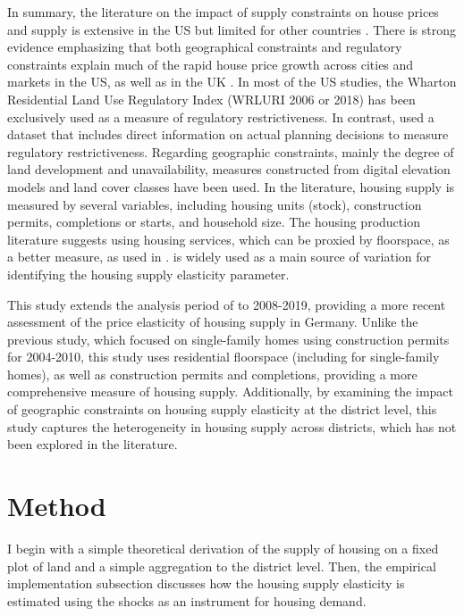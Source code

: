 \documentclass[
  12pt,
]{article}
\begin{document}
In summary, the literature on the impact of supply constraints on house
prices and supply is extensive in the US but limited for other countries
\citep{hilber_vermeulen_2016}. There is strong evidence emphasizing that
both geographical constraints \citep[see][]{saiz_2010, paciorek_2013}
and regulatory constraints
\citep[see][]{glaeser_gyourko_2005, paciorek_2013, gyourko_etal_2021, glaeser_2020}
explain much of the rapid house price growth across cities and markets
in the US, as well as in the UK \citep{hilber_vermeulen_2016}. In most
of the US studies, the Wharton Residential Land Use Regulatory Index
(WRLURI 2006 or 2018) has been exclusively used as a measure of
regulatory restrictiveness. In contrast, \citet{hilber_vermeulen_2016}
used a dataset that includes direct information on actual planning
decisions to measure regulatory restrictiveness. Regarding geographic
constraints, mainly the degree of land development and unavailability,
measures constructed from digital elevation models and land cover
classes have been used. In the literature, housing supply is measured by
several variables, including housing units (stock), construction
permits, completions or starts, and household size. The housing
production literature \citep[see][]{epple_etal_2010, combes_etal_2021}
suggests using housing services, which can be proxied by floorspace, as
a better measure, as used in \citet{baum-snow_han_2019}.
\citet{bartik_1991} is widely used as a main source of variation for
identifying the housing supply elasticity parameter.

This study extends the analysis period of \citet{lerbs_2014} to
2008-2019, providing a more recent assessment of the price elasticity of
housing supply in Germany. Unlike the previous study, which focused on
single-family homes using construction permits for 2004-2010, this study
uses residential floorspace (including for single-family homes), as well
as construction permits and completions, providing a more comprehensive
measure of housing supply. Additionally, by examining the impact of
geographic constraints on housing supply elasticity at the district
level, this study captures the heterogeneity in housing supply across
districts, which has not been explored in the literature.

\section{Method}\label{method}

I begin with a simple theoretical derivation of the supply of housing on
a fixed plot of land and a simple aggregation to the district level.
Then, the empirical implementation subsection discusses how the housing
supply elasticity is estimated using the \citet{bartik_1991} shocks as
an instrument for housing demand.
\end{document}
